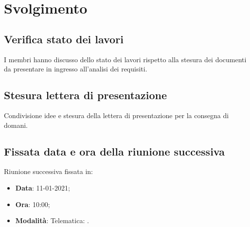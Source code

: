 \documentclass[]{article}
\begin{document}
	\newpage

	\section{Svolgimento}
		\subsection{Verifica stato dei lavori}
		I membri hanno discusso dello stato dei lavori rispetto alla stesura dei documenti da presentare in ingresso all'analisi dei requisiti.
		
		\subsection{Stesura lettera di presentazione}
		Condivisione idee e stesura della lettera di presentazione per la consegna di domani.
		
		\subsection{Fissata data e ora della riunione successiva}
		Riunione successiva fissata in:
		\begin{itemize}
			\item \textbf{Data}: 11-01-2021;
			\item \textbf{Ora}: 10:00;
			\item \textbf{Modalità}: Telematica: .
		\end{itemize}
	
\end{document}
